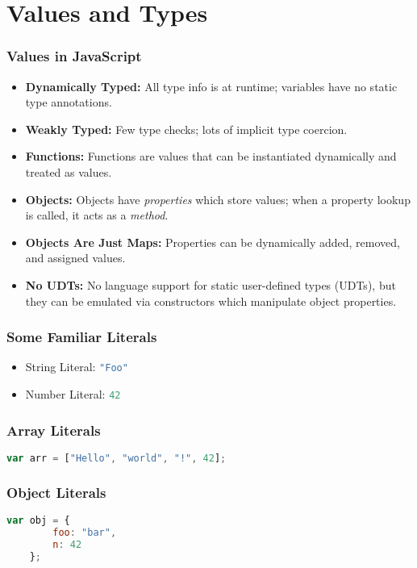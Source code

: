 \section{Values and Types}

\begin{frame}
    \frametitle{Values in JavaScript}
    \begin{itemize}
        \item{\textbf{Dynamically Typed:} All type info is at runtime; variables
              have no static type annotations.}
        \item{\textbf{Weakly Typed:} Few type checks; lots of implicit type
              coercion.}
        \item{\textbf{Functions:} Functions are values that can be instantiated
              dynamically and treated as values.}
        \item{\textbf{Objects:} Objects have \textit{properties} which store
              values; when a property lookup is called, it acts as a
              \textit{method}.}
        \item{\textbf{Objects Are Just Maps:} Properties can be dynamically
              added, removed, and assigned values.}
        \item{\textbf{No UDTs:} No language support for static user-defined
              types (UDTs), but they can be emulated via constructors which
              manipulate object properties.}
    \end{itemize}
\end{frame}

\begin{frame}[fragile]
    \frametitle{Some Familiar Literals}
    \begin{itemize}
        \item{String Literal: \lstinline[language=JavaScript]{"Foo"}}
        \item{Number Literal: \lstinline[language=JavaScript]{42}}
    \end{itemize}
\end{frame}

\begin{frame}[fragile]
    \frametitle{Array Literals}
    \begin{lstlisting}[language=JavaScript]
    var arr = ["Hello", "world", "!", 42];
    \end{lstlisting}
\end{frame}

\begin{frame}[fragile]
    \frametitle{Object Literals}
    \begin{lstlisting}[language=JavaScript]
    var obj = {
        foo: "bar",
        n: 42
    };
    \end{lstlisting}
\end{frame}


